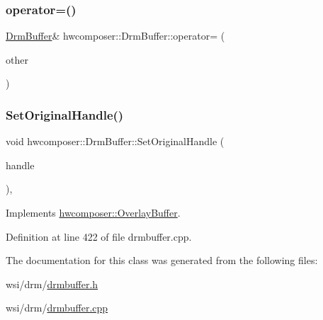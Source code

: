 \subsubsection{\texorpdfstring{operator=()}{operator=()}}
{\footnotesize\ttfamily \mbox{\hyperlink{classhwcomposer_1_1DrmBuffer}{Drm\+Buffer}}\& hwcomposer\+::\+Drm\+Buffer\+::operator= (\begin{DoxyParamCaption}\item[{\mbox{\hyperlink{classhwcomposer_1_1DrmBuffer}{Drm\+Buffer}} \&\&}]{other }\end{DoxyParamCaption})\hspace{0.3cm}{\ttfamily [default]}}

\mbox{\label{classhwcomposer_1_1DrmBuffer_a2d7dbadddf5cce8260aa224af1b495c1}} 
\subsubsection{\texorpdfstring{Set\+Original\+Handle()}{SetOriginalHandle()}}
{\footnotesize\ttfamily void hwcomposer\+::\+Drm\+Buffer\+::\+Set\+Original\+Handle (\begin{DoxyParamCaption}\item[{\mbox{\hyperlink{alios_2platformdefines_8h_ac0a2eaf260f556d17fe489911f017bdf}{H\+W\+C\+Native\+Handle}}}]{handle }\end{DoxyParamCaption})\hspace{0.3cm}{\ttfamily [override]}, {\ttfamily [virtual]}}



Implements \mbox{\hyperlink{classhwcomposer_1_1OverlayBuffer_a458dd8327bacb7a6560ac539e76ae408}{hwcomposer\+::\+Overlay\+Buffer}}.



Definition at line 422 of file drmbuffer.\+cpp.


\begin{DoxyCode}{0}
\end{DoxyCode}


The documentation for this class was generated from the following files\+:\begin{DoxyCompactItemize}
\item 
wsi/drm/\mbox{\hyperlink{drmbuffer_8h}{drmbuffer.\+h}}\item 
wsi/drm/\mbox{\hyperlink{drmbuffer_8cpp}{drmbuffer.\+cpp}}\end{DoxyCompactItemize}
